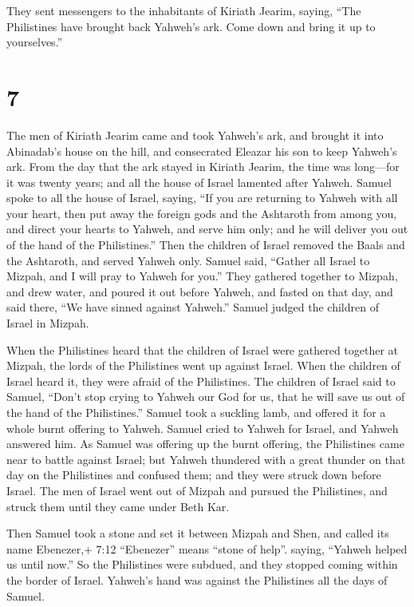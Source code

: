  They sent messengers to the inhabitants of Kiriath Jearim,
saying, ``The Philistines have brought back Yahweh's ark. Come down and
bring it up to yourselves.''

\hypertarget{section-6}{%
\section{7}\label{section-6}}

 The men of Kiriath Jearim came and took Yahweh's ark, and
brought it into Abinadab's house on the hill, and consecrated Eleazar
his son to keep Yahweh's ark.  From the day that the ark
stayed in Kiriath Jearim, the time was long---for it was twenty years;
and all the house of Israel lamented after Yahweh.  Samuel
spoke to all the house of Israel, saying, ``If you are returning to
Yahweh with all your heart, then put away the foreign gods and the
Ashtaroth from among you, and direct your hearts to Yahweh, and serve
him only; and he will deliver you out of the hand of the Philistines.''
 Then the children of Israel removed the Baals and the
Ashtaroth, and served Yahweh only.  Samuel said, ``Gather
all Israel to Mizpah, and I will pray to Yahweh for you.'' 
They gathered together to Mizpah, and drew water, and poured it out
before Yahweh, and fasted on that day, and said there, ``We have sinned
against Yahweh.'' Samuel judged the children of Israel in Mizpah.

 When the Philistines heard that the children of Israel were
gathered together at Mizpah, the lords of the Philistines went up
against Israel. When the children of Israel heard it, they were afraid
of the Philistines.  The children of Israel said to Samuel,
``Don't stop crying to Yahweh our God for us, that he will save us out
of the hand of the Philistines.''  Samuel took a suckling
lamb, and offered it for a whole burnt offering to Yahweh. Samuel cried
to Yahweh for Israel, and Yahweh answered him.  As Samuel
was offering up the burnt offering, the Philistines came near to battle
against Israel; but Yahweh thundered with a great thunder on that day on
the Philistines and confused them; and they were struck down before
Israel.  The men of Israel went out of Mizpah and pursued
the Philistines, and struck them until they came under Beth Kar.

 Then Samuel took a stone and set it between Mizpah and
Shen, and called its name Ebenezer,+ 7:12 ``Ebenezer'' means ``stone of
help''. saying, ``Yahweh helped us until now.''  So the
Philistines were subdued, and they stopped coming within the border of
Israel. Yahweh's hand was against the Philistines all the days of
Samuel.

